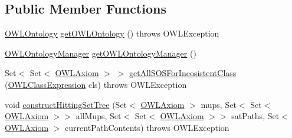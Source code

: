 \subsection*{Public Member Functions}
\begin{DoxyCompactItemize}
\item 
\hyperlink{interfaceorg_1_1semanticweb_1_1owlapi_1_1model_1_1_o_w_l_ontology}{O\-W\-L\-Ontology} \hyperlink{classorg_1_1semanticweb_1_1owlapi_1_1debugging_1_1_abstract_o_w_l_debugger_a111bea8f818fcb96ab18c0f31a26e854}{get\-O\-W\-L\-Ontology} ()  throws O\-W\-L\-Exception 
\item 
\hyperlink{interfaceorg_1_1semanticweb_1_1owlapi_1_1model_1_1_o_w_l_ontology_manager}{O\-W\-L\-Ontology\-Manager} \hyperlink{classorg_1_1semanticweb_1_1owlapi_1_1debugging_1_1_abstract_o_w_l_debugger_ae80168c378abc8383a7e0a5641e77581}{get\-O\-W\-L\-Ontology\-Manager} ()
\item 
Set$<$ Set$<$ \hyperlink{interfaceorg_1_1semanticweb_1_1owlapi_1_1model_1_1_o_w_l_axiom}{O\-W\-L\-Axiom} $>$ $>$ \hyperlink{classorg_1_1semanticweb_1_1owlapi_1_1debugging_1_1_abstract_o_w_l_debugger_a627ba1054245b1e194f03b84e44b895b}{get\-All\-S\-O\-S\-For\-Incosistent\-Class} (\hyperlink{interfaceorg_1_1semanticweb_1_1owlapi_1_1model_1_1_o_w_l_class_expression}{O\-W\-L\-Class\-Expression} cls)  throws O\-W\-L\-Exception 
\item 
void \hyperlink{classorg_1_1semanticweb_1_1owlapi_1_1debugging_1_1_abstract_o_w_l_debugger_aee0c39be04e76fff9d5eacb8bfe94114}{construct\-Hitting\-Set\-Tree} (Set$<$ \hyperlink{interfaceorg_1_1semanticweb_1_1owlapi_1_1model_1_1_o_w_l_axiom}{O\-W\-L\-Axiom} $>$ mups, Set$<$ Set$<$ \hyperlink{interfaceorg_1_1semanticweb_1_1owlapi_1_1model_1_1_o_w_l_axiom}{O\-W\-L\-Axiom} $>$$>$ all\-Mups, Set$<$ Set$<$ \hyperlink{interfaceorg_1_1semanticweb_1_1owlapi_1_1model_1_1_o_w_l_axiom}{O\-W\-L\-Axiom} $>$$>$ sat\-Paths, Set$<$ \hyperlink{interfaceorg_1_1semanticweb_1_1owlapi_1_1model_1_1_o_w_l_axiom}{O\-W\-L\-Axiom} $>$ current\-Path\-Contents)  throws O\-W\-L\-Exception 
\end{DoxyCompactItemize}
